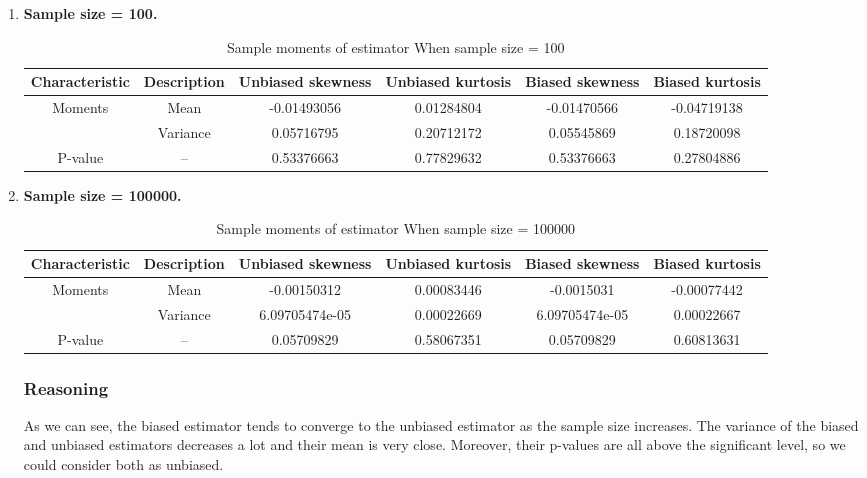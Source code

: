 \documentclass[11pt,en]{elegantpaper}
\begin{document}
\begin{enumerate}[leftmargin = 30pt]
     \item \textbf{Sample size = 100.}
     \begin{table}[h]
        \centering
        \caption{Sample moments of estimator When sample size = 100}
        \label{table3}
        \begin{tabular}{@{}cccccc@{}}
            \toprule
            \textbf{Characteristic} & \textbf{Description} & \textbf{Unbiased skewness}& \textbf{Unbiased kurtosis}& \textbf{Biased skewness} & \textbf{Biased kurtosis}\\
            \midrule
            Moments & Mean & -0.01493056 & 0.01284804 & -0.01470566 & -0.04719138 \\
            & Variance & 0.05716795 & 0.20712172 & 0.05545869 & 0.18720098 \\
            P-value & -- & 0.53376663 & 0.77829632 & 0.53376663 & 0.27804886\\
            \bottomrule
        \end{tabular}
    \end{table}

    \item \textbf{Sample size = 100000.}
    \begin{table}[h]
       \centering
       \caption{Sample moments of estimator When sample size = 100000}
       \label{table4}
       \begin{tabular}{@{}cccccc@{}}
           \toprule
           \textbf{Characteristic} & \textbf{Description} & \textbf{Unbiased skewness}& \textbf{Unbiased kurtosis}& \textbf{Biased skewness} & \textbf{Biased kurtosis}\\
           \midrule
           Moments & Mean & -0.00150312 & 0.00083446 & -0.0015031 & -0.00077442 \\
           & Variance & 6.09705474e-05 & 0.00022669 & 6.09705474e-05 & 0.00022667 \\
           P-value & -- & 0.05709829 & 0.58067351 & 0.05709829 & 0.60813631\\
           \bottomrule
       \end{tabular}
   \end{table}

   \subsubsection*{Reasoning}
   As we can see, the biased estimator tends to converge to the unbiased estimator as the sample size increases. 
   The variance of the biased and unbiased estimators decreases a lot and their mean is very close. Moreover, 
   their p-values are all above the significant level, so we could consider both as unbiased.
\end{enumerate}
\end{document}
